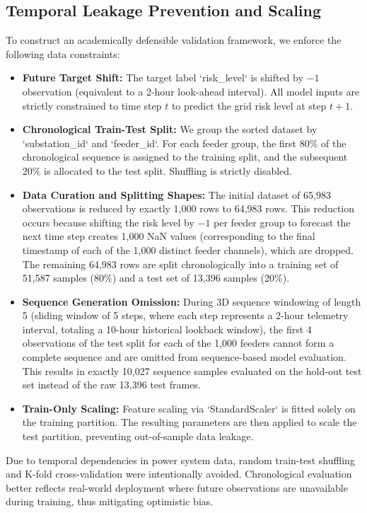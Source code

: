 \subsection{Temporal Leakage Prevention and Scaling}
To construct an academically defensible validation framework, we enforce the following data constraints:
\begin{itemize}
    \item \textbf{Future Target Shift:} The target label `risk\_level` is shifted by $-1$ observation (equivalent to a 2-hour look-ahead interval). All model inputs are strictly constrained to time step $t$ to predict the grid risk level at step $t+1$.
    \item \textbf{Chronological Train-Test Split:} We group the sorted dataset by `substation\_id` and `feeder\_id`. For each feeder group, the first 80\% of the chronological sequence is assigned to the training split, and the subsequent 20\% is allocated to the test split. Shuffling is strictly disabled.
    \item \textbf{Data Curation and Splitting Shapes:} The initial dataset of 65,983 observations is reduced by exactly 1,000 rows to 64,983 rows. This reduction occurs because shifting the risk level by $-1$ per feeder group to forecast the next time step creates 1,000 NaN values (corresponding to the final timestamp of each of the 1,000 distinct feeder channels), which are dropped. The remaining 64,983 rows are split chronologically into a training set of 51,587 samples (80\%) and a test set of 13,396 samples (20\%).
    \item \textbf{Sequence Generation Omission:} During 3D sequence windowing of length 5 (sliding window of 5 steps, where each step represents a 2-hour telemetry interval, totaling a 10-hour historical lookback window), the first 4 observations of the test split for each of the 1,000 feeders cannot form a complete sequence and are omitted from sequence-based model evaluation. This results in exactly 10,027 sequence samples evaluated on the hold-out test set instead of the raw 13,396 test frames.
    \item \textbf{Train-Only Scaling:} Feature scaling via `StandardScaler` is fitted solely on the training partition. The resulting parameters are then applied to scale the test partition, preventing out-of-sample data leakage.
\end{itemize}

Due to temporal dependencies in power system data, random train-test shuffling and K-fold cross-validation were intentionally avoided. Chronological evaluation better reflects real-world deployment where future observations are unavailable during training, thus mitigating optimistic bias.
